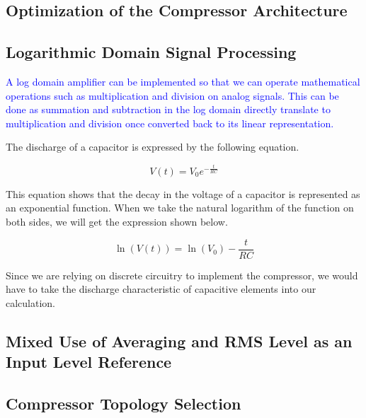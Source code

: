 \documentclass[10pt]{article}
\begin{document}
\begin{multicols*}{2}
\begin{minipage}{\linewidth}
                \end{minipage}
        
        \section{Optimization of the Compressor Architecture}
            
            \subsection{Logarithmic Domain Signal Processing}
                \textcolor{blue}{A log domain amplifier can be implemented so that we can operate mathematical operations such as multiplication and division on analog signals. This can be done as summation and subtraction in the log domain directly translate to multiplication and division once converted back to its linear representation.}

                The discharge of a capacitor is expressed by the following equation.              
                
                \begin{equation}
                    V(t) = V_0 e^{-\frac{t}{RC}}
                \end{equation}    
                
                This equation shows that the decay in the voltage of a capacitor is represented as an exponential function.
                When we take the natural logarithm of the function on both sides, we will get the expression shown below.
                
                \begin{equation}
                    \ln(V(t)) = \ln(V_0) - \frac{t}{RC}
                \end{equation}
                
                Since we are relying on discrete circuitry to implement the compressor, we would have to take the discharge characteristic of capacitive elements into our calculation.

            \subsection{Mixed Use of Averaging and RMS Level as an Input Level Reference}

            \subsection{Compressor Topology Selection}


\end{multicols*}
\end{document}
